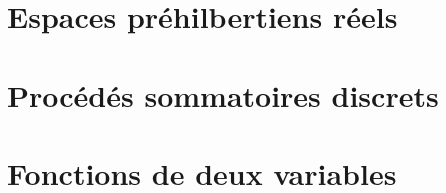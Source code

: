 \documentclass[a4paper, 10pt, twoside]{report}
\begin{document}
    

\chapter{Espaces préhilbertiens réels}

    

\chapter{Procédés sommatoires discrets}

    

\chapter{Fonctions de deux variables}

    





\tableofcontents

    
\end{document}
